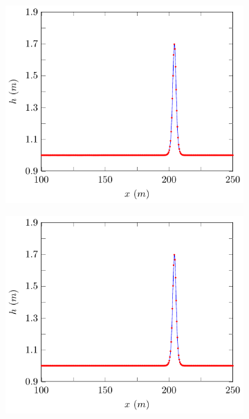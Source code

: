 \begin{figure}
\begin{subfigure}{0.5\textwidth}
	\end{subfigure}
	\begin{subfigure}{0.5\textwidth}
		\includegraphics[width=\textwidth]{./chp5/figures/Analytic/Soliton/Example/FEVM2.pdf}
	\end{subfigure}%
	\begin{subfigure}{0.5\textwidth}
		\includegraphics[width=\textwidth]{./chp5/figures/Analytic/Soliton/Example/FDVM3.pdf}
	\end{subfigure}

\end{figure}
